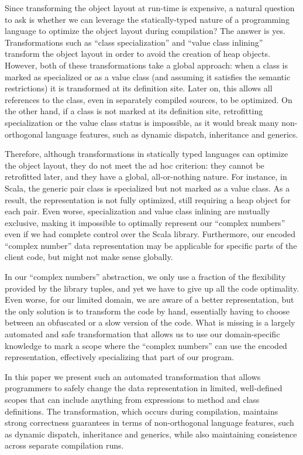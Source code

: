 Since transforming the object layout at run-time is expensive, a natural question to ask is whether we can leverage the statically-typed nature of a programming language to optimize the object layout during compilation? The answer is yes. Transformations such as ``class specialization'' and ``value class inlining'' transform the object layout in order to avoid the creation of heap objects. However, both
of these transformations take a global approach: when a class is marked as specialized or as a value class (and assuming it satisfies the semantic restrictions) it is transformed at its definition site. Later
on, this allows all references to the class, even in separately compiled sources, to be optimized. On the other hand, if a class is not marked at its definition site, retrofitting specialization or the value class status is impossible, as it would break many non-orthogonal language features, such as dynamic dispatch, inheritance and generics.

Therefore, although transformations in statically typed languages can optimize the object layout, they do not meet the ad hoc criterion: they cannot be retrofitted later, and they have a global, all-or-nothing
nature. For instance, in Scala, the generic pair class is specialized but not marked as a value class. As a result, the representation is not fully optimized, still requiring a heap object for each pair. Even
worse, specialization and value class inlining are mutually exclusive, making it impossible to optimally represent our ``complex numbers'' even if we had complete control over the Scala library. Furthermore, our encoded ``complex number'' data representation may be applicable for specific parts of the client code, but might not make sense globally.

In our ``complex numbers'' abstraction, we only use a fraction of the flexibility provided by the library tuples, and yet we have to give up all the code optimality. Even worse, for our limited domain, we are aware of a better representation, but the only solution is to transform the code by hand, essentially having to choose between an obfuscated or a slow version of the code. What is missing is a largely automated and safe transformation that allows us to use our domain-specific knowledge to mark a scope where the ``complex numbers'' can use the encoded representation, effectively specializing that part of our program.

In this paper we present such an automated transformation that allows programmers to safely change the data representation in limited, well-defined scopes that can include anything from expressions to method and class definitions. The transformation, which occurs during compilation, maintains strong correctness guarantees in terms of non-orthogonal language features, such as dynamic dispatch, inheritance and generics, while also maintaining consistence across separate compilation runs.

